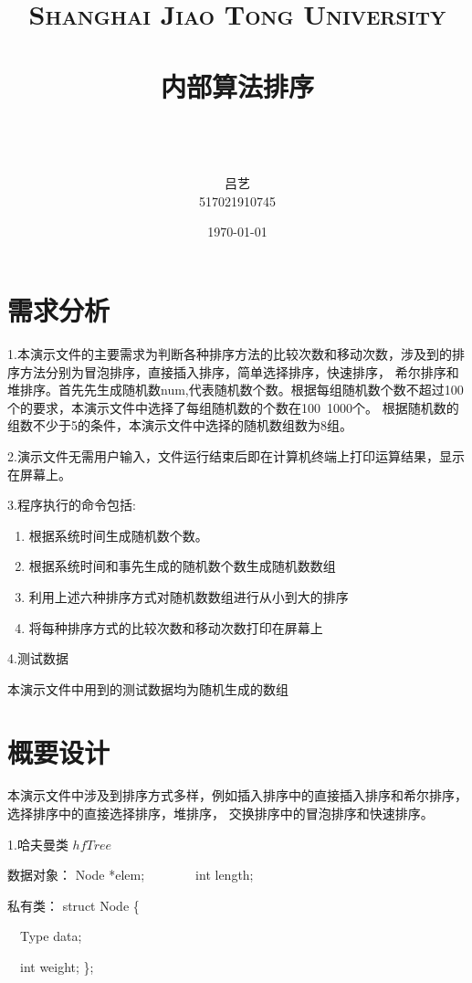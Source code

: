 \documentclass[paper=a4,UTF8,fontsize=11pt]{scrartcl} %
\title{
\normalfont \normalsize
\textsc{Shanghai Jiao Tong University} \\ [25pt] %
\horrule{0.5pt} \\[0.4cm] %
\huge 内部算法排序 \\ %
\horrule{2pt} \\[0.5cm] %
}
\author{\\ \kaishu 吕艺\\ \normalsize 517021910745} %
\date{\normalsize\today} %
\numberwithin{equation}{section} %
\numberwithin{figure}{section} %
\numberwithin{table}{section} %
\begin{document}
\maketitle %
\kaishu
\section{需求分析}

1.本演示文件的主要需求为判断各种排序方法的比较次数和移动次数，涉及到的排序方法分别为冒泡排序，直接插入排序，简单选择排序，快速排序，
希尔排序和堆排序。首先先生成随机数num,代表随机数个数。根据每组随机数个数不超过100个的要求，本演示文件中选择了每组随机数的个数在100~1000个。
根据随机数的组数不少于5的条件，本演示文件中选择的随机数组数为8组。
\vspace{0.5cm}

2.演示文件无需用户输入，文件运行结束后即在计算机终端上打印运算结果，显示在屏幕上。
\vspace{0.5cm}
\newpage

3.程序执行的命令包括:
\begin{enumerate}
    \item 根据系统时间生成随机数个数。
    \item 根据系统时间和事先生成的随机数个数生成随机数数组
    \item 利用上述六种排序方式对随机数数组进行从小到大的排序
    \item 将每种排序方式的比较次数和移动次数打印在屏幕上
\end{enumerate}

\vspace{0.8cm}

4.测试数据

本演示文件中用到的测试数据均为随机生成的数组
\vspace{0.8cm}

\section{概要设计}

本演示文件中涉及到排序方式多样，例如插入排序中的直接插入排序和希尔排序，选择排序中的直接选择排序，堆排序，
交换排序中的冒泡排序和快速排序。

1.哈夫曼类 $hfTree$

数据对象： Node *elem;\ \ \ \ \ \ \ \ int length;

私有类：   struct Node \{

    \qquad \qquad \ \  Type data;

    \qquad \qquad \ \ int weight; \}; 
\end{document}
